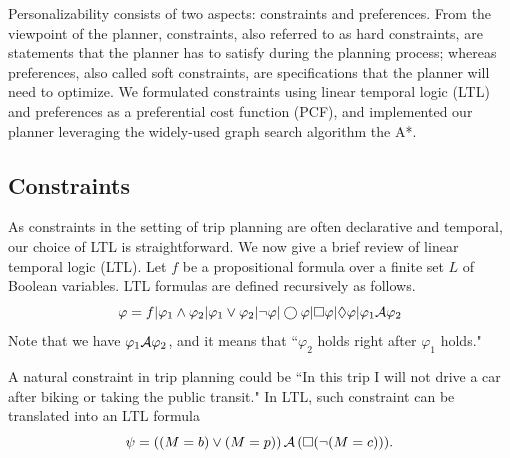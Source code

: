 Personalizability consists of two aspects: constraints and preferences.
From the viewpoint of the planner,
constraints, also referred to as hard constraints, are statements that the planner
has to satisfy during the planning process; whereas preferences, also called
soft constraints, are specifications that the planner will need to optimize.
We formulated constraints using linear temporal logic (LTL) and preferences as
a preferential cost function (PCF), and implemented our planner leveraging the
widely-used graph search algorithm the A*.

\subsection{Constraints}
As constraints in the setting of trip planning are often declarative and
temporal, our choice of LTL is straightforward.
We now give a brief review of linear temporal logic (LTL).
Let $f$ be a propositional formula over a finite set $L$ of Boolean variables.  
LTL formulas are defined recursively as follows.
\begin{equation}
	\varphi = f | \varphi_1 \land \varphi_2 | \varphi_1 \lor \varphi_2 | \neg \varphi | 
		\bigcirc \varphi |	\Box \varphi | \Diamond \varphi | \varphi_1 \mathcal{A} \varphi_2
\end{equation}
Note that we have $\varphi_1 \mathcal{A} \varphi_2$, and it means that
``$\varphi_2$ holds right after $\varphi_1$ holds."

A natural constraint in trip planning could be ``In this trip I will not drive a car 
after biking or taking the public transit."
In LTL, such constraint can be translated into an LTL formula
\begin{equation}
\label{eqt:ex}
	\psi = ((M=b) \lor (M=p)) \,\mathcal{A}\, (\Box (\neg (M=c))).
\end{equation}

